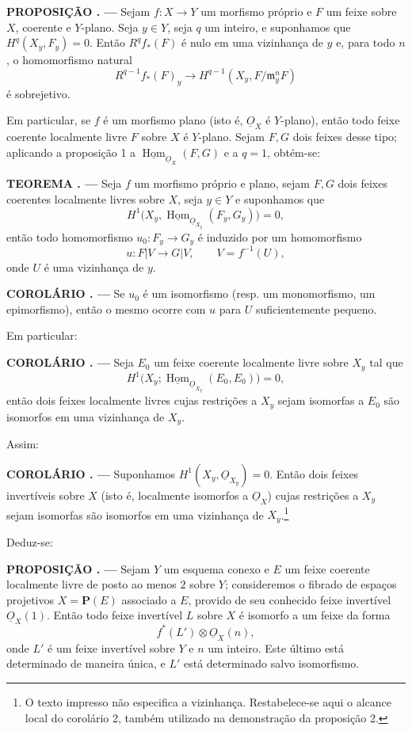 \documentclass[11pt,twoside,openany]{book}
\numberwithin{equation}{section}
\newcommand{\src}[1]{%
  \phantomsection\hypertarget{src:#1}{}%
  \marginpar{\raggedleft\footnotesize\sffamily #1}%
}
\newcommand{\Osh}{\underline{O}}
\newcommand{\Homsh}{\underline{\operatorname{Hom}}}
\theoremstyle{plain}
\theoremstyle{definition}
\theoremstyle{remark}
\newcommand{\result}[2]{%
  \par\medskip\noindent\textbf{#1%
  \if\relax\detokenize{#2}\relax\else\space#2\fi. ---}\enspace
}
\newcommand{\FgaUnitKey}{frontmatter}
\renewcommand{\src}[1]{%
  \phantomsection\hypertarget{src:\FgaUnitKey:#1}{}%
  \marginpar{\raggedleft\footnotesize\sffamily #1}%
}
\begin{document}
\src{201}
\result{PROPOSIÇÃO}{1} Sejam $f:X\longrightarrow Y$ um morfismo próprio e $F$
um feixe sobre $X$, coerente e $Y$-plano. Seja $y\in Y$, seja $q$ um inteiro, e
suponhamos que $H^q(X_y,F_y)=0$. Então $R^qf_*(F)$ é nulo em uma vizinhança de
$y$ e, para todo $n$, o homomorfismo natural
\[
  R^{q-1}f_*(F)_y\longrightarrow
  H^{q-1}(X_y,F/\mathfrak m_y^nF)
\]
é sobrejetivo.

Em particular, se $f$ é um morfismo plano (isto é, $\Osh_X$ é $Y$-plano),
então todo feixe coerente localmente livre $F$ sobre $X$ é $Y$-plano. Sejam
$F,G$ dois feixes desse tipo; aplicando a proposição 1 a
$\Homsh_{\Osh_X}(F,G)$ e a $q=1$, obtém-se:

\result{TEOREMA}{7} Seja $f$ um morfismo próprio e plano, sejam $F,G$ dois feixes
coerentes localmente livres sobre $X$, seja $y\in Y$ e suponhamos que
\[
  H^1\bigl(X_y,\Homsh_{\Osh_{X_y}}(F_y,G_y)\bigr)=0,
\]
então todo homomorfismo $u_0:F_y\longrightarrow G_y$ é induzido por um
homomorfismo
\[
  u:F|V\longrightarrow G|V,
  \qquad V=f^{-1}(U),
\]
onde $U$ é uma vizinhança de $y$.

\result{COROLÁRIO}{} Se $u_0$ é um isomorfismo (resp. um monomorfismo, um
epimorfismo), então o mesmo ocorre com $u$ para $U$ suficientemente
pequeno.

Em particular:

\src{202}
\result{COROLÁRIO}{2} Seja $E_0$ um feixe coerente localmente livre sobre $X_y$
tal que
\[
  H^1\bigl(X_y;\Homsh_{\Osh_{X_y}}(E_0,E_0)\bigr)=0,
\]
então dois feixes localmente livres cujas restrições a $X_y$ sejam isomorfas
a $E_0$ são isomorfos em uma vizinhança de $X_y$.

Assim:

\result{COROLÁRIO}{3} Suponhamos $H^1(X_y,\Osh_{X_y})=0$. Então dois feixes
invertíveis sobre $X$ (isto é, localmente isomorfos a $\Osh_X$) cujas
restrições a $X_y$ sejam isomorfas são isomorfos em uma vizinhança de $X_y$.\footnote{O texto impresso não especifica a vizinhança. Restabelece-se aqui o alcance local do corolário 2, também utilizado na demonstração da proposição 2.}

Deduz-se:

\result{PROPOSIÇÃO}{2} Sejam $Y$ um esquema conexo e $E$ um feixe coerente localmente livre de posto ao menos $2$ sobre $Y$; consideremos o fibrado de espaços projetivos
$X=\mathbf P(E)$ associado a $E$, provido de seu conhecido feixe invertível
$\Osh_X(1)$. Então todo feixe invertível $L$ sobre $X$ é isomorfo a um feixe da
forma
\[
  f^*(L')\otimes\Osh_X(n),
\]
onde $L'$ é um feixe invertível sobre $Y$ e $n$ um inteiro. Este último está
determinado de maneira única, e $L'$ está determinado salvo isomorfismo.
\end{document}

